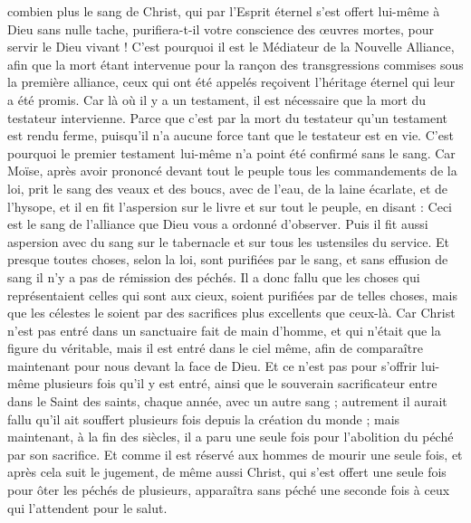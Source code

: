 \begin{multicols}{2}
combien plus le sang de Christ, qui par l'Esprit éternel s'est offert lui-même à Dieu sans nulle tache, purifiera-t-il votre conscience des œuvres mortes, pour servir le Dieu vivant !
C'est pourquoi il est le Médiateur de la Nouvelle Alliance, afin que la mort étant intervenue pour la rançon des transgressions commises sous la première alliance, ceux qui ont été appelés reçoivent l’héritage éternel qui leur a été promis.
Car là où il y a un testament, il est nécessaire que la mort du testateur intervienne.
Parce que c'est par la mort du testateur qu'un testament est rendu ferme, puisqu’il n'a aucune force tant que le testateur est en vie.
C’est pourquoi le premier testament  lui-même n’a point été confirmé sans le sang.
Car Moïse, après avoir prononcé devant tout le peuple tous les commandements de la loi, prit le sang des veaux et des boucs, avec de l'eau, de la laine écarlate, et de l'hysope, et il en fit l’aspersion sur le livre et sur tout le peuple, en disant :
Ceci est le sang de l’alliance que Dieu vous a ordonné d'observer.
Puis il fit aussi aspersion avec du sang sur le tabernacle et sur tous les ustensiles du service.
Et presque toutes choses, selon la loi, sont purifiées par le sang, et sans effusion de sang il n’y a pas de rémission des péchés.
Il a donc fallu que les choses qui représentaient celles qui sont aux cieux, soient purifiées par de telles choses, mais que les célestes le soient par des sacrifices plus excellents que ceux-là.
Car Christ n'est pas entré dans un sanctuaire fait de main d’homme, et qui n’était que la figure du véritable, mais il est entré dans le ciel même, afin de comparaître maintenant pour nous devant la face de Dieu.
Et ce n’est pas pour s’offrir lui-même plusieurs fois qu’il y est entré, ainsi que le souverain sacrificateur entre dans le Saint des saints, chaque année, avec un autre sang ;
autrement il aurait fallu qu'il ait souffert plusieurs fois depuis la création du monde ; mais maintenant, à la fin des siècles, il a paru une seule fois pour l'abolition du péché par son sacrifice.
Et comme il est réservé aux hommes de mourir une seule fois, et après cela suit le jugement,
de même aussi Christ, qui s’est offert une seule fois pour ôter les péchés de plusieurs, apparaîtra sans péché une seconde fois à ceux qui l'attendent pour le salut.

\end{multicols}
